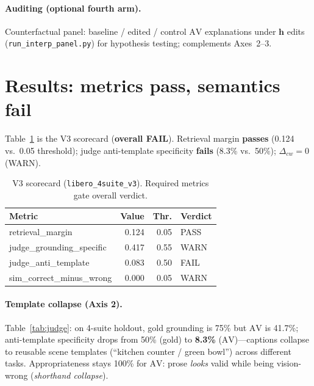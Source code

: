 \documentclass{article}
\newcommand{\AV}{\ensuremath{\mathrm{AV}}}
\newcommand{\hvec}{\mathbf{h}}
\newcommand{\code}[1]{\texttt{\small #1}}
\begin{document}
\paragraph{Auditing (optional fourth arm).}
Counterfactual panel: baseline / edited / control \(\AV\) explanations under
\(\hvec\) edits (\code{run\_interp\_panel.py}) for hypothesis testing;
complements Axes~2--3.

\section{Results: metrics pass, semantics fail}
\label{sec:results}

Table~\ref{tab:scorecard} is the V3 scorecard (\textbf{overall FAIL}).
Retrieval margin \textbf{passes} (0.124 vs.\ 0.05 threshold); judge
anti-template specificity \textbf{fails} (8.3\% vs.\ 50\%);
\(\Delta_{cw}=0\) (WARN).

\begin{table}[t]
  \centering
  \caption{V3 scorecard (\code{libero\_4suite\_v3}). Required metrics
  gate overall verdict.}
  \label{tab:scorecard}
  \small
  \begin{tabular}{@{}lrrl@{}}
    \toprule
    Metric & Value & Thr. & Verdict \\
    \midrule
    retrieval\_margin & 0.124 & 0.05 & PASS \\
    judge\_grounding\_specific & 0.417 & 0.55 & WARN \\
    judge\_anti\_template & 0.083 & 0.50 & FAIL \\
    sim\_correct\_minus\_wrong & 0.000 & 0.05 & WARN \\
    \bottomrule
  \end{tabular}
\end{table}

\paragraph{Template collapse (Axis 2).}
Table~\ref{tab:judge}: on 4-suite holdout, gold grounding is 75\% but
\(\AV\) is 41.7\%; anti-template specificity drops from 50\% (gold) to
\textbf{8.3\%} (\(\AV\))---captions collapse to reusable scene templates
(``kitchen counter / green bowl'') across different tasks.
Appropriateness stays 100\% for \(\AV\): prose \emph{looks} valid while
being vision-wrong (\emph{shorthand collapse}).
\end{document}
